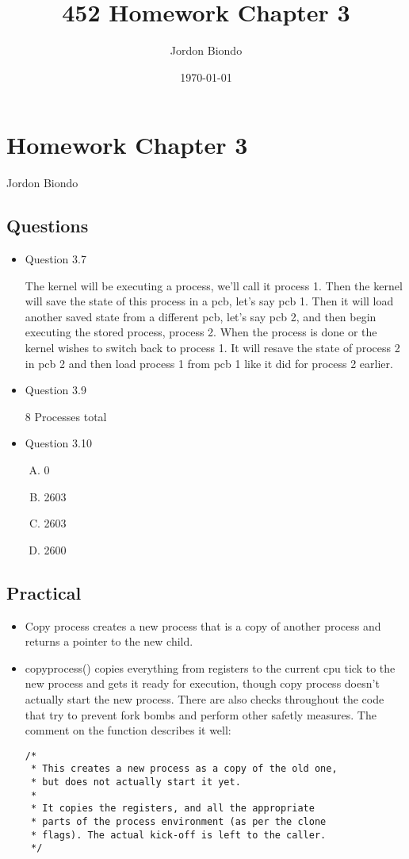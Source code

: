 \documentclass[11pt]{article}
\title{452 Homework Chapter 3}
\author{Jordon Biondo}
\date{\today}
\begin{document}
\maketitle

\setcounter{tocdepth}{3}
\tableofcontents
\section{Homework Chapter 3}
\label{sec-1}

  Jordon Biondo
\subsection{Questions}
\label{sec-1-1}

\begin{itemize}
\item Question 3.7
  
  The kernel will be executing a process, we'll call it process 1. Then the kernel will save the state of this process in a pcb, let's say pcb 1. Then it will load another saved state from a different pcb, let's say pcb 2, and then begin executing the stored process, process 2. When the process is done or the kernel wishes to switch back to process 1. It will resave the state of process 2 in pcb 2 and then load process 1 from pcb 1 like it did for process 2 earlier.
\item Question 3.9
  
     8 Processes total
\item Question 3.10
\begin{enumerate}[(A)]
\item 0
\item 2603
\item 2603
\item 2600
\end{enumerate}
\end{itemize}
\pagebreak
\subsection{Practical}
\label{sec-1-2}

\begin{itemize}
\item Copy process creates a new process that is a copy of another process and returns a pointer
     to the new child.
\item copy\textunderscore process() copies everything from registers to the current cpu tick
     to the new process and gets it ready for execution, though copy process doesn't actually
     start the new process. There are also checks throughout the code that try to prevent
     fork bombs and perform other safetly measures. The comment on the function describes it well:

\begin{verbatim}
/*
 * This creates a new process as a copy of the old one,
 * but does not actually start it yet.
 *
 * It copies the registers, and all the appropriate
 * parts of the process environment (as per the clone
 * flags). The actual kick-off is left to the caller.
 */
\end{verbatim}
\end{itemize}
     
\end{document}
